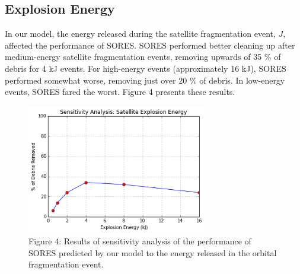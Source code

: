 \documentclass[12pt]{scrartcl}
\begin{document}
\subsection{Explosion Energy}
In our model, the energy released during the satellite fragmentation event, $J$, affected the performance of SORES. SORES performed better cleaning up after medium-energy satellite fragmentation events, removing upwards of 35 \% of debris for 4 kJ events. For high-energy events (approximately 16 kJ), SORES performed somewhat worse, removing just over 20 \% of debris. In low-energy events, SORES fared the worst. Figure 4 presents these results. 
\begin{figure}
\begin{center}
\label{fig:explosionenergysensitivity}
\includegraphics[width=0.7\textwidth]{energy.png}\\
Figure 4: Results of sensitivity analysis of the performance of SORES predicted by our model to the energy released in the orbital fragmentation event.
\end{center}
\end{figure}
\end{document}

